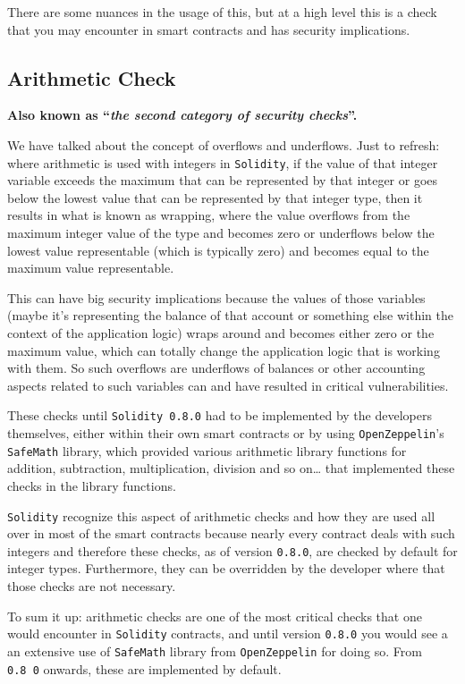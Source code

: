 There are some nuances in the usage of this, but at a high level this is
a check that you may encounter in smart contracts and has security
implications.

\subsection{Arithmetic Check}\label{arithmetic-check}

\textbf{Also known as ``\emph{the second category of security
checks}''.}

We have talked about the concept of overflows and underflows. Just to
refresh: where arithmetic is used with integers in \texttt{Solidity}, if
the value of that integer variable exceeds the maximum that can be
represented by that integer or goes below the lowest value that can be
represented by that integer type, then it results in what is known as
wrapping, where the value overflows from the maximum integer value of
the type and becomes zero or underflows below the lowest value
representable (which is typically zero) and becomes equal to the maximum
value representable.

This can have big security implications because the values of those
variables (maybe it's representing the balance of that account or
something else within the context of the application logic) wraps around
and becomes either zero or the maximum value, which can totally change
the application logic that is working with them. So such overflows are
underflows of balances or other accounting aspects related to such
variables can and have resulted in critical vulnerabilities.

These checks until \texttt{Solidity\ 0.8.0} had to be implemented by the
developers themselves, either within their own smart contracts or by
using \texttt{OpenZeppelin}'s \texttt{SafeMath} library, which provided
various arithmetic library functions for addition, subtraction,
multiplication, division and so on\ldots{} that implemented these checks
in the library functions.

\texttt{Solidity} recognize this aspect of arithmetic checks and how
they are used all over in most of the smart contracts because nearly
every contract deals with such integers and therefore these checks, as
of version \texttt{0.8.0}, are checked by default for integer types.
Furthermore, they can be overridden by the developer where that those
checks are not necessary.

To sum it up: arithmetic checks are one of the most critical checks that
one would encounter in \texttt{Solidity} contracts, and until version
\texttt{0.8.0} you would see a an extensive use of \texttt{SafeMath}
library from \texttt{OpenZeppelin} for doing so. From \texttt{0.8\ 0}
onwards, these are implemented by default.
